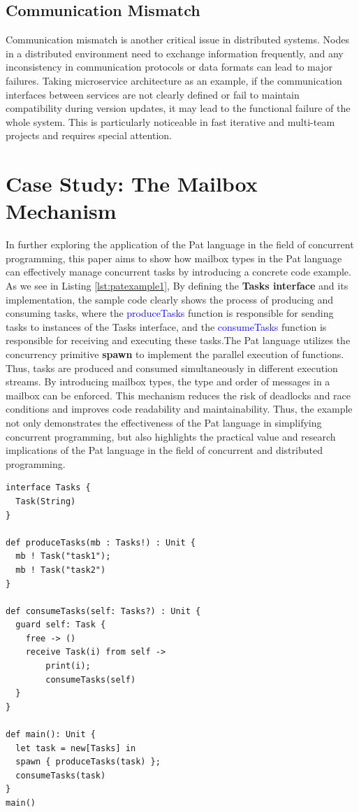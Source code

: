 \documentclass{l4proj}
\begin{document}
\subsection{Communication Mismatch}

Communication mismatch is another critical issue in distributed systems. Nodes in a distributed environment need to exchange information frequently, and any inconsistency in communication protocols or data formats can lead to major failures. Taking microservice architecture as an example, if the communication interfaces between services are not clearly defined or fail to maintain compatibility during version updates, it may lead to the functional failure of the whole system. This is particularly noticeable in fast iterative and multi-team projects and requires special attention.

\section{Case Study: The Mailbox Mechanism}

In further exploring the application of the Pat language in the field of concurrent programming, this paper aims to show how mailbox types in the Pat language can effectively manage concurrent tasks by introducing a concrete code example. As we see in Listing \ref{lst:patexample1}, By defining the \textbf{Tasks interface} and its implementation, the sample code clearly shows the process of producing and consuming tasks, where the \textcolor{blue}{produceTasks} function is responsible for sending tasks to instances of the Tasks interface, and the \textcolor{blue}{consumeTasks} function is responsible for receiving and executing these tasks.The Pat language utilizes the concurrency primitive \textbf{spawn} to implement the parallel execution of functions. Thus, tasks are produced and consumed simultaneously in different execution streams. By introducing mailbox types, the type and order of messages in a mailbox can be enforced. This mechanism reduces the risk of deadlocks and race conditions and improves code readability and maintainability. Thus, the example not only demonstrates the effectiveness of the Pat language in simplifying concurrent programming, but also highlights the practical value and research implications of the Pat language in the field of concurrent and distributed programming.

\noindent\begin{minipage}{\linewidth}
\lstset{style=patstyle}
\begin{lstlisting}[caption=Pat Language Example, label={lst:patexample1}]
interface Tasks {
  Task(String)
}

def produceTasks(mb : Tasks!) : Unit {
  mb ! Task("task1");
  mb ! Task("task2")
}

def consumeTasks(self: Tasks?) : Unit {
  guard self: Task {
    free -> ()
    receive Task(i) from self ->
        print(i);
        consumeTasks(self)
  }
}

def main(): Unit {
  let task = new[Tasks] in
  spawn { produceTasks(task) };
  consumeTasks(task)
}
main()
\end{lstlisting}
\end{minipage}
\end{document}
